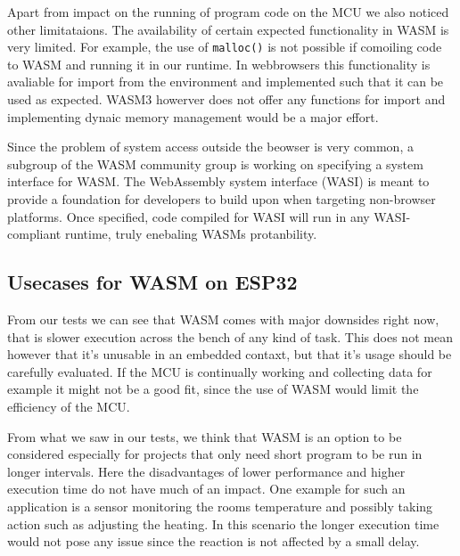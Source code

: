 Apart from impact on the running of program code on the MCU we also noticed other limitataions. The availability of certain expected functionality in WASM is very limited. For example, the use of \lstinline{malloc()} is not possible if comoiling code to WASM and running it in our runtime. In webbrowsers this functionality is avaliable for import from the environment and implemented such that it can be used as expected. WASM3 howerver does not offer any functions for import and implementing dynaic memory management would be a major effort.

Since the problem of system access outside the beowser is very common, a subgroup of the WASM community group is working on specifying a system interface for WASM\autocite{clark_standardizing_2019}. The WebAssembly system interface (WASI) is meant to provide a foundation for developers to build upon when targeting non-browser platforms. Once specified, code compiled for WASI will run in any WASI-compliant runtime, truly enebaling WASMs protanbility.
\subsection{Usecases for WASM on ESP32}
From our tests we can see that WASM comes with major downsides right now, that is slower execution across the bench of any kind of task. This does not mean however that it's unusable in an embedded contaxt, but that it's usage should be carefully evaluated. If the MCU is continually working and collecting data for example it might not be a good fit, since the use of WASM would limit the efficiency of the MCU.

From what we saw in our tests, we think that WASM is an option to be considered especially for projects that only need short program to be run in longer intervals. Here the disadvantages of lower performance and higher execution time do not have much of an impact. One example for such an application is a sensor monitoring the rooms temperature and possibly taking action such as adjusting the heating. In this scenario the longer execution time would not pose any issue since the reaction is not affected by a small delay.
